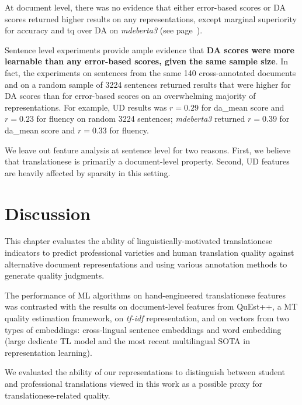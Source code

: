 
At document level, there was no evidence that either error-based scores or DA scores returned higher results on any representations, except marginal superiority for accuracy and tq over DA on \textit{mdeberta3} (see page~\pageref{tab:err140rand_res}).

Sentence level experiments provide ample evidence that \textbf{DA scores were more learnable than any error-based scores, given the same sample size}. In fact, the experiments on sentences from the same 140 cross-annotated documents and on a random sample of 3224 sentences returned results that were higher for DA scores than for error-based scores on an overwhelming majority of representations. 
For example, UD results was $r=0.29$ for da\_mean score and $r=0.23$ for fluency on random 3224 sentences; \textit{mdeberta3} returned $r=0.39$ for da\_mean score and $r=0.33$ for fluency.

We leave out feature analysis at sentence level for two reasons. First, we believe that translationese is primarily a document-level property. Second, UD features are heavily affected by sparsity in this setting. 

\section{\label{sec:qua_disc}Discussion}
This chapter evaluates the ability of linguistically-motivated translationese indicators to predict professional varieties and human translation quality against alternative document representations and using various annotation methods to generate quality judgments. 

The performance of ML algorithms on hand-engineered translationese features was contrasted with the results on document-level features from QuEst++, a MT quality estimation framework, on \textit{tf-idf} representation, and on vectors from two types of embeddings: cross-lingual sentence embeddings and word embedding (large dedicate TL model and the most recent multilingual SOTA in representation learning).

We evaluated the ability of our representations to distinguish between student and professional translations viewed in this work as a possible proxy for translationese-related quality.

